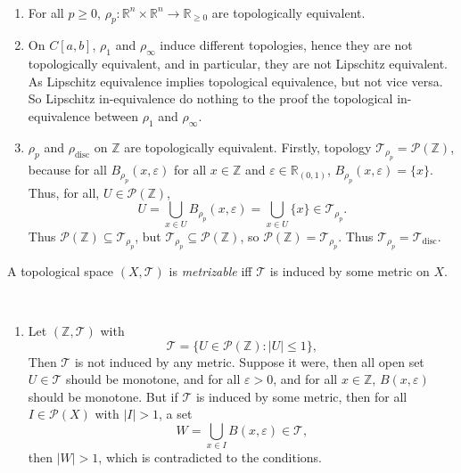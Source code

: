 \begin{note} \ 
	\begin{enumerate}
		\item For all $p \ge 0$, $\rho_p: \mathbb R^n \times \mathbb R^n \to \mathbb R_{\ge 0}$ are topologically equivalent.
		
		\item On $C[a,b]$, $\rho_1$ and $\rho_\infty$ induce different topologies, hence they are not topologically equivalent, and in particular, they are not Lipschitz equivalent. As Lipschitz equivalence implies topological equivalence, but not vice versa. So Lipschitz in-equivalence do nothing to the proof the topological in-equivalence between $\rho_1$ and $\rho_\infty$. 
		
		\item $\rho_p$ and $\rho_\text{disc}$ on $\mathbb Z$ are topologically equivalent. Firstly, topology $\mathcal T_{\rho_p} = \mathcal P(\mathbb Z)$, because for all $B_{\rho_p} (x, \varepsilon)$ for all $x \in \mathbb Z$ and $\varepsilon \in \mathbb R_{(0,1)}$,  $B_{\rho_p}(x, \varepsilon) = \{x\}$. Thus, for all, $U \in \mathcal P(\mathbb Z)$,
			$$
			U = \bigcup_{x \in U} B_{\rho_p}(x, \varepsilon) = \bigcup_{x \in U} \{x\} \in \mathcal T_{\rho_p}.
			$$
			Thus $\mathcal P(\mathbb Z) \subseteq \mathcal T_{\rho_p}$, but $\mathcal T_{\rho_p} \subseteq \mathcal P(\mathbb Z)$, so $\mathcal P(\mathbb Z) = \mathcal T_{\rho_p}$. Thus $\mathcal T_{\rho_p} = \mathcal T_\text{disc}$.
	\end{enumerate}
\end{note}


\begin{definition}
	A topological space $(X, \mathcal T)$ is \textit{metrizable} iff $\mathcal T$ is induced by some metric on $X$.
\end{definition}


\begin{note} \
	\begin{enumerate}
		\item Let $(\mathbb Z, \mathcal T)$ with
		$$
		\mathcal T = \{ U \in \mathcal P(\mathbb Z) : |U| \le 1 \},
		$$
		Then $\mathcal T$ is not induced by any metric. Suppose it were, then all open set $U \in \mathcal T$ should be monotone, and for all $\varepsilon > 0$, and for all $x \in \mathbb Z$, $B(x, \varepsilon)$ should be monotone. But if $\mathcal T$ is induced by some metric, then for all $I \in \mathcal P(X)$ with $|I| > 1$, a set
		$$
		W = \bigcup_{x \in I} B(x, \varepsilon) \in \mathcal T,
		$$
		then $|W| > 1$, which is contradicted to the conditions.
	\end{enumerate}
\end{note}


